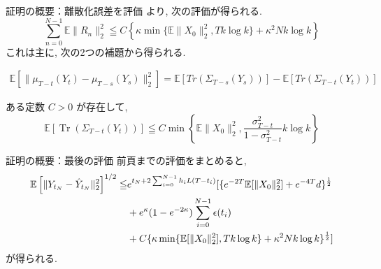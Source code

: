 \documentclass[11pt]{beamer}
\theoremstyle{plain}
\theoremstyle{definition}
\renewcommand{\cite}[1]{\citep{#1}}
\newcommand{\E}{\mathbb{E}}
\newcommand{\Tr}{\operatorname{Tr}}
\begin{document}
    \begin{frame}{証明の概要：離散化誤差を評価}
      \cite{huang_wei_chen_2026} より, 次の評価が得られる.
      \begin{equation}
        \sum_{n=0}^{N-1}\E\|R_n\|_2^2
        \leqq
        C\left\{
        \kappa\min\{\E\|X_0\|_2^2,Tk\log k\}
        +\kappa^2Nk\log k
        \right\}
      \end{equation}
      これは主に, 次の2つの補題から得られる.
      \begin{lemma}
        \begin{align}\label{eq:posterior-mean-increment}
          \E\left[
              \|\mu_{T-t}(Y_t)-\mu_{T-s}(Y_s)\|_2^2
          \right]=
          \E\left[Tr\left(\Sigma_{T-s}(Y_s)\right)\right]
          -
          \E\left[Tr\left(\Sigma_{T-t}(Y_t)\right)\right]
      \end{align}
      \end{lemma}
      \begin{lemma}
        ある定数 $C>0$ が存在して, 
        \begin{equation}\label{eq:posterior-covariance-bound}
          \E\left[\Tr\left(\Sigma_{T-t}(Y_t)\right)\right]
          \leqq
          C\min\left\{
              \E\|X_0\|_2^2,
              \frac{\sigma_{T-t}^2}{1-\sigma_{T-t}^2}k\log k
          \right\}
      \end{equation}
      \end{lemma}
    \end{frame}

    \begin{frame}{証明の概要：最後の評価}
      前頁までの評価をまとめると, 
      \begin{align}
        \E\left[\|Y_{t_N}-\hat{Y}_{t_N}\|_2^2\right]^{1/2}\leqq& e^{t_N+2\sum_{i=0}^{N-1}h_iL(T-t_i)}[\{e^{-2T}\E[\|X_0\|_2^2]+e^{-4T}d\}^{\frac{1}{2}}\notag\\
        &+e^\kappa(1-e^{-2\kappa})\sum_{i=0}^{N-1}\epsilon(t_i)\notag\\
        &+C\{\kappa\min\{\E[\|X_0\|_2^2],Tk\log{k}\}+\kappa^2Nk\log{k}\}^\frac{1}{2}]
      \end{align}
      が得られる.
    \end{frame}
\end{document}
